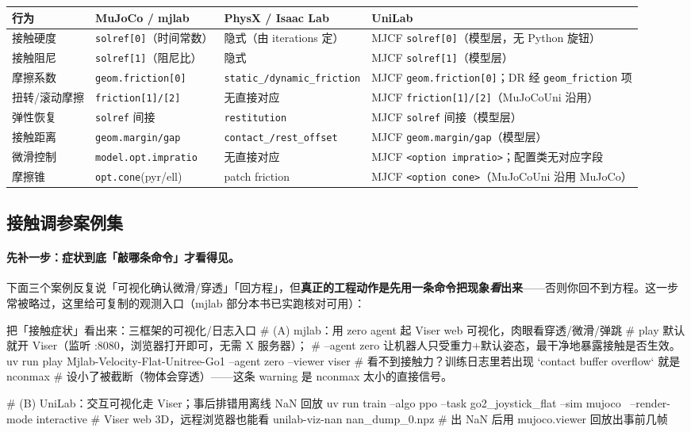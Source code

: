 \begin{center}
\small
\begin{tabular}{@{}lp{2.7cm}p{2.7cm}p{3.4cm}@{}}
\toprule
行为 & MuJoCo / mjlab & PhysX / Isaac Lab & UniLab \\
\midrule
接触硬度 & \verb|solref[0]|（时间常数） & 隐式（由 iterations 定） & MJCF \verb|solref[0]|（模型层，无 Python 旋钮） \\
接触阻尼 & \verb|solref[1]|（阻尼比） & 隐式 & MJCF \verb|solref[1]|（模型层） \\
摩擦系数 & \verb|geom.friction[0]| & \verb|static_/dynamic_friction| & MJCF \verb|geom.friction[0]|；DR 经 \verb|geom_friction| 项 \\
扭转/滚动摩擦 & \verb|friction[1]/[2]| & 无直接对应 & MJCF \verb|friction[1]/[2]|（MuJoCoUni 沿用） \\
弹性恢复 & \verb|solref| 间接 & \verb|restitution| & MJCF \verb|solref| 间接（模型层） \\
接触距离 & \verb|geom.margin/gap| & \verb|contact_/rest_offset| & MJCF \verb|geom.margin/gap|（模型层） \\
微滑控制 & \verb|model.opt.impratio| & 无直接对应 & MJCF \verb|<option impratio>|；配置类无对应字段 \\
摩擦锥 & \verb|opt.cone|(pyr/ell) & patch friction & MJCF \verb|<option cone>|（MuJoCoUni 沿用 MuJoCo） \\
\bottomrule
\end{tabular}
\end{center}

\subsection{接触调参案例集}

\paragraph{先补一步：症状到底「敲哪条命令」才看得见。}下面三个案例反复说「可视化确认微滑/穿透」「回方程」，但\textbf{真正的工程动作是先用一条命令把现象\emph{看}出来}——否则你回不到方程。这一步常被略过，这里给可复制的观测入口（mjlab 部分本书已实跑核对可用）：

\begin{codebox}[bash]{把「接触症状」看出来：三框架的可视化/日志入口}
# (A) mjlab：用 zero agent 起 Viser web 可视化，肉眼看穿透/微滑/弹跳
#     play 默认就开 Viser（监听 :8080，浏览器打开即可，无需 X 服务器）；
#     --agent zero 让机器人只受重力+默认姿态，最干净地暴露接触是否生效。
uv run play Mjlab-Velocity-Flat-Unitree-Go1 --agent zero --viewer viser
#     看不到接触力？训练日志里若出现 `contact buffer overflow` 就是 nconmax
#     设小了被截断（物体会穿透）——这条 warning 是 nconmax 太小的直接信号。

# (B) UniLab：交互可视化走 Viser；事后排错用离线 NaN 回放
uv run train --algo ppo --task go2_joystick_flat --sim mujoco \
    --render-mode interactive          # Viser web 3D，远程浏览器也能看
unilab-viz-nan nan_dump_0.npz          # 出 NaN 后用 mujoco.viewer 回放出事前几帧
\end{codebox}

